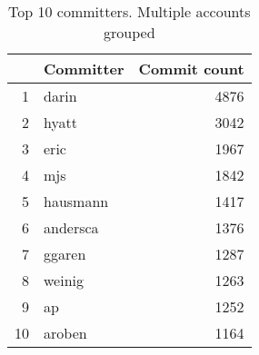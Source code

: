 \begin{table}[!htpb]
\begin{center}
\begin{tabular}{rlr}
  \hline
 & Committer & Commit count \\ 
  \hline
1 & darin & 4876 \\ 
  2 & hyatt & 3042 \\ 
  3 & eric & 1967 \\ 
  4 & mjs & 1842 \\ 
  5 & hausmann & 1417 \\ 
  6 & andersca & 1376 \\ 
  7 & ggaren & 1287 \\ 
  8 & weinig & 1263 \\ 
  9 & ap & 1252 \\ 
  10 & aroben & 1164 \\ 
   \hline
\end{tabular}
\caption{Top 10 committers. Multiple accounts grouped}
\label{commits:top20grouped}
\end{center}
\end{table}
